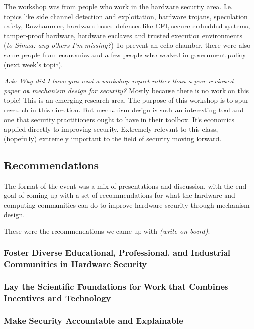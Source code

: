 \documentclass[11pt]{article}
\begin{document}
The workshop was from people who work in the hardware security area. I.e. topics like side channel detection and exploitation, hardware trojans, speculation safety, Rowhammer, hardware-based defenses like CFI, secure embedded systems, tamper-proof hardware, hardware enclaves and trusted execution environments ({\it to Simha: any others I'm missing?})
To prevent an echo chamber, there were also some people from economics and a few people who worked in government policy (next week's topic).

{\it Ask: Why did I have you read a workshop report rather than a peer-reviewed paper on mechanism design for security?} Mostly because there is no work on this topic! This is an emerging research area. The purpose of this workshop is to spur research in this direction. But mechanism design is such an interesting tool and one that security practitioners ought to have in their toolbox. It's economics applied directly to improving security. Extremely relevant to this class, (hopefully) extremely important to the field of security moving forward.

\subsection{Recommendations}

The format of the event was a mix of presentations and discussion, with the end goal of coming up with a set of recommendations for what the hardware and computing communities can do to improve hardware security through mechanism design. 

These were the recommendations we came up with {\it (write on board)}:

\subsubsection{Foster Diverse Educational, Professional, and Industrial Communities in Hardware Security}

\subsubsection{Lay the Scientific Foundations for Work that Combines Incentives and Technology}

\subsubsection{ Make Security Accountable and Explainable}
\end{document}
